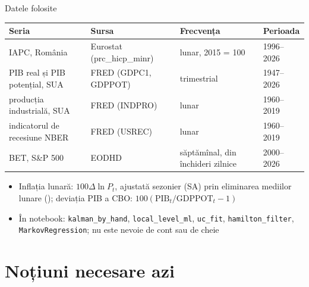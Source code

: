 \begin{frame}{Datele folosite}
\itemsize{\small}
\begin{center}
\footnotesize
\begin{tabular}{llll}
\toprule
\textbf{Seria} & \textbf{Sursa} & \textbf{Frecvența} & \textbf{Perioada} \\
\midrule
IAPC, România & Eurostat (prc\_hicp\_minr) & lunar, 2015 = 100 & 1996--2026 \\
PIB real și PIB potențial, SUA & FRED (GDPC1, GDPPOT) & trimestrial & 1947--2026 \\
producția industrială, SUA & FRED (INDPRO) & lunar & 1960--2019 \\
indicatorul de recesiune NBER & FRED (USREC) & lunar & 1960--2019 \\
BET, S\&P 500 & EODHD & săptămînal, din închideri zilnice & 2000--2026 \\
\bottomrule
\end{tabular}
\end{center}
\begin{itemize}
    \item Inflația lunară: $100\Delta\ln P_t$, ajustată sezonier (SA) prin eliminarea mediilor lunare (); deviația PIB a CBO: $100(\mathrm{PIB}_t/\mathrm{GDPPOT}_t - 1)$
    \item În notebook: \texttt{kalman\_by\_hand}, \texttt{local\_level\_ml}, \texttt{uc\_fit}, \texttt{hamilton\_filter}, \texttt{MarkovRegression}; nu este nevoie de cont sau de cheie
\end{itemize}
\end{frame}


\section{Noțiuni necesare azi}

